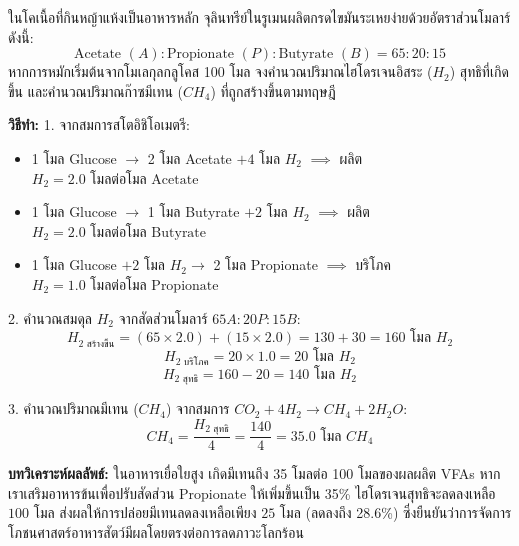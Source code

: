 \begin{worked}
ในโคเนื้อที่กินหญ้าแห้งเป็นอาหารหลัก จุลินทรีย์ในรูเมนผลิตกรดไขมันระเหยง่ายด้วยอัตราส่วนโมลาร์ดังนี้:
$$\text{Acetate } (A) : \text{Propionate } (P) : \text{Butyrate } (B) = 65 : 20 : 15$$
หากการหมักเริ่มต้นจากโมเลกุลกลูโคส 100 โมล จงคำนวณปริมาณไฮโดรเจนอิสระ ($H_2$) สุทธิที่เกิดขึ้น และคำนวณปริมาณก๊าซมีเทน ($CH_4$) ที่ถูกสร้างขึ้นตามทฤษฎี

\textbf{วิธีทำ:}
1. จากสมการสโตอิชิโอเมตรี:
\begin{itemize}
    \item 1 โมล Glucose $\rightarrow$ 2 โมล Acetate $+ 4$ โมล $H_2$ $\implies$ ผลิต $H_2 = 2.0\text{ โมลต่อโมล Acetate}$
    \item 1 โมล Glucose $\rightarrow$ 1 โมล Butyrate $+ 2$ โมล $H_2$ $\implies$ ผลิต $H_2 = 2.0\text{ โมลต่อโมล Butyrate}$
    \item 1 โมล Glucose $+ 2$ โมล $H_2 \rightarrow$ 2 โมล Propionate $\implies$ บริโภค $H_2 = 1.0\text{ โมลต่อโมล Propionate}$
\end{itemize}

2. คำนวณสมดุล $H_2$ จากสัดส่วนโมลาร์ $65A : 20P : 15B$:
$$H_{2\text{ สร้างขึ้น}} = (65 \times 2.0) + (15 \times 2.0) = 130 + 30 = 160\text{ โมล } H_2$$
$$H_{2\text{ บริโภค}} = 20 \times 1.0 = 20\text{ โมล } H_2$$
$$H_{2\text{ สุทธิ}} = 160 - 20 = 140\text{ โมล } H_2$$

3. คำนวณปริมาณมีเทน ($CH_4$) จากสมการ $CO_2 + 4 H_2 \rightarrow CH_4 + 2 H_2O$:
$$CH_4 = \frac{H_{2\text{ สุทธิ}}}{4} = \frac{140}{4} = 35.0\text{ โมล } CH_4$$

\textbf{บทวิเคราะห์ผลลัพธ์:} ในอาหารเยื่อใยสูง เกิดมีเทนถึง 35 โมลต่อ 100 โมลของผลผลิต VFAs หากเราเสริมอาหารข้นเพื่อปรับสัดส่วน Propionate ให้เพิ่มขึ้นเป็น 35\% ไฮโดรเจนสุทธิจะลดลงเหลือ $100\text{ โมล}$ ส่งผลให้การปล่อยมีเทนลดลงเหลือเพียง $25\text{ โมล}$ (ลดลงถึง 28.6\%) ซึ่งยืนยันว่าการจัดการโภชนศาสตร์อาหารสัตว์มีผลโดยตรงต่อการลดภาวะโลกร้อน
\end{worked}

